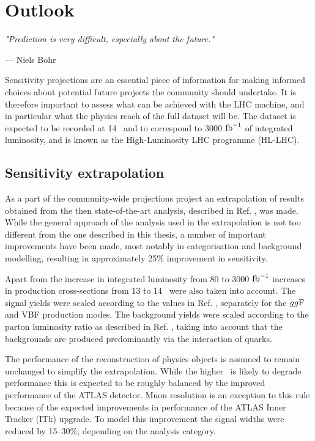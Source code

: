 \chapter{Outlook}

\textit{"Prediction is very difficult, especially about the future."}

\vspace{5mm}
\begin{flushright}
--- Niels Bohr
\end{flushright}

\thispagestyle{empty}

\newpage

Sensitivity projections are an essential piece of information for
making informed choices about potential future projects the community
should undertake.
It is therefore important to assess what can be achieved with the LHC
machine, and in particular what the physics reach of the full dataset
will be. The dataset is expected to be recorded at 14 \TeV~and to
correspond to 3000 $\text{fb}^{-1}$ of integrated luminosity, and is known
as the High-Luminosity LHC programme (HL-LHC).

\section{Sensitivity extrapolation}

As a part of the community-wide projections project \cite{ATL-PHYS-PUB-2018-054, Cepeda:2019klc}
an extrapolation of results obtained from the then state-of-the-art
analysis, described in Ref. \cite{ATLAS-CONF-2018-026}, was made.
While the general approach of the analysis used in the extrapolation
is not too different from the one described in this thesis, a number
of important improvements have been made, most notably in categorisation
and background modelling, resulting in approximately 25\% improvement
in sensitivity.

Apart from the increase in integrated luminosity from 80 to 3000 $\text{fb}^{-1}$
increases in production cross-sections from 13 to 14 \TeV~were also
taken into account. The signal yields were scaled according to the
values in Ref. \cite{deFlorian:2016spz}, separately for the $gg\text{F}$
and VBF production modes. The background yields were scaled according
to the parton luminosity ratio as described in Ref. \cite{Heinemeyer:2013tqa},
taking into account that the backgrounds are produced predominantly via
the interaction of quarks.

The performance of the reconstruction of physics objects is assumed
to remain unchanged to simplify the extrapolation. While the higher
\pileup~is likely to degrade performance this is expected to be
roughly balanced by the improved performance of the ATLAS detector.
Muon resolution is an exception to this rule because of the
expected improvements in performance of the ATLAS Inner Tracker (ITk)
upgrade. To model this improvement the signal widths were reduced 
by 15--30\%, depending on the analysis category.




